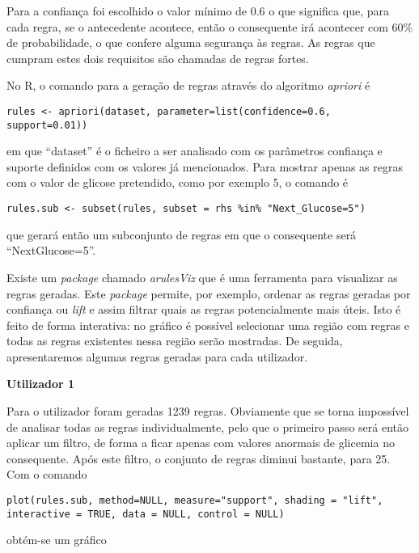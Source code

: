 Para a confiança foi escolhido o valor mínimo de 0.6 o que significa que, para cada regra, se o antecedente acontece, então o consequente irá acontecer com 60\% de probabilidade, o que confere alguma segurança às regras. As regras que cumpram estes dois requisitos são chamadas de regras fortes.


No R, o comando para a geração de regras através do algoritmo \textit{apriori} é

\begin{lstlisting}
rules <- apriori(dataset, parameter=list(confidence=0.6, support=0.01))
\end{lstlisting}

em que ``dataset'' é o ficheiro a ser analisado com os parâmetros confiança e suporte definidos com os valores já mencionados. Para mostrar apenas as regras com o valor de glicose pretendido, como por exemplo 5, o comando é

\begin{lstlisting}
rules.sub <- subset(rules, subset = rhs %in% "Next_Glucose=5")
\end{lstlisting}

que gerará então um subconjunto de regras em que o consequente será ``Next\textunderscore Glucose=5''.

Existe um \textit{package} chamado \textit{arulesViz} que é uma ferramenta para visualizar as regras geradas. Este \textit{package} permite, por exemplo, ordenar as regras geradas por confiança ou \textit{lift} e assim filtrar quais as regras potencialmente mais úteis. Isto é feito de forma interativa: no gráfico é possível selecionar uma região com regras e todas as regras existentes nessa região serão mostradas.
De seguida, apresentaremos algumas regras geradas para cada utilizador.

\textbf{Utilizador 1}

Para o utilizador foram geradas 1239 regras. Obviamente que se torna impossível de analisar todas as regras individualmente, pelo que o primeiro passo será então aplicar um filtro, de forma a ficar apenas com valores anormais de glicemia no consequente. Após este filtro, o conjunto de regras diminui bastante, para 25. Com o comando

\begin{lstlisting}
plot(rules.sub, method=NULL, measure="support", shading = "lift", interactive = TRUE, data = NULL, control = NULL)
\end{lstlisting}

obtém-se um gráfico

